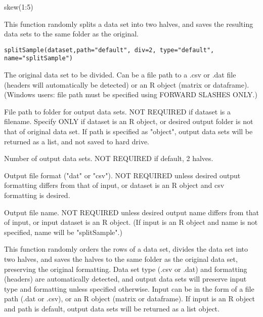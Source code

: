 \documentclass[a4paper]{book}
\begin{document}
%
\begin{Examples}
\begin{ExampleCode}
skew(1:5)
\end{ExampleCode}
\end{Examples}
%
\begin{Description}\relax
This function randomly splits a data set into two halves, and saves the resulting data sets to the same folder as the original. 
\end{Description}
%
\begin{Usage}
\begin{verbatim}
splitSample(dataset,path="default", div=2, type="default", name="splitSample")
\end{verbatim}
\end{Usage}
%
\begin{Arguments}
\begin{ldescription}
\item[\code{dataset}] The original data set to be divided. Can be a file path to a .csv or .dat file (headers will automatically be detected) or an R object (matrix or dataframe). (Windows users: file path must be specified using FORWARD SLASHES ONLY.)
\item[\code{path}] File path to folder for output data sets. NOT REQUIRED if dataset is a filename. Specify ONLY if dataset is an R object, or desired output folder is not that of original data set. If path is specified as "object", output data sets will be returned as a list, and not saved to hard drive. 
\item[\code{div}] Number of output data sets. NOT REQUIRED if default, 2 halves.	
\item[\code{type}] Output file format ("dat" or "csv"). NOT REQUIRED unless desired output formatting differs from that of input, or dataset is an R object and csv formatting is desired.	
\item[\code{name}] Output file name. NOT REQUIRED unless desired output name differs from that of input, or input dataset is an R object. (If input is an R object and name is not specified, name will be "splitSample".)	
\end{ldescription}
\end{Arguments}
%
\begin{Details}\relax
This function randomly orders the rows of a data set, divides the data set into two halves, and saves the halves to the same folder as the original data set, preserving the original formatting. Data set type (.csv or .dat) and formatting (headers) are automatically detected, and output data sets will preserve input type and formatting unless specified otherwise. Input can be in the form of a file path (.dat or .csv), or an R object (matrix or dataframe). If input is an R object and path is default, output data sets will be returned as a list object.  
\end{Details}
\end{document}
